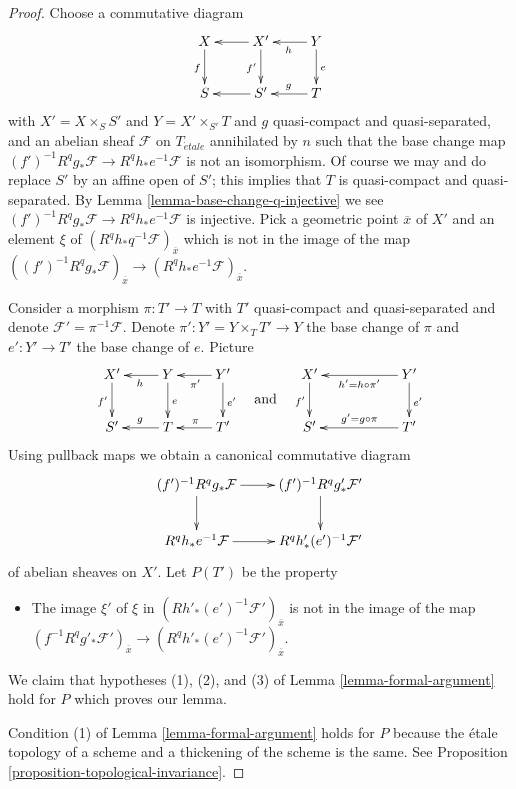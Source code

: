 \documentclass[10pt,a4paper]{amsart}
\theoremstyle{plain}
\theoremstyle{definition}
\theoremstyle{remark}
\numberwithin{equation}{subsection}
\def\etale{{\acute{e}tale}}
\begin{document}
\begin{proof}
Choose a commutative diagram
$$
\xymatrix{
X \ar[d]_f & X' \ar[l] \ar[d]_{f'} & Y \ar[l]^h \ar[d]^e \\
S & S' \ar[l] & T \ar[l]_g
}
$$
with $X' = X \times_S S'$ and $Y = X' \times_{S'} T$ and
$g$ quasi-compact and quasi-separated, and an abelian sheaf
$\mathcal{F}$ on $T_\etale$ annihilated by $n$ such that
the base change map
$(f')^{-1}R^qg_*\mathcal{F} \to R^qh_*e^{-1}\mathcal{F}$
is not an isomorphism. Of course we may and do replace $S'$
by an affine open of $S'$; this implies that $T$ is quasi-compact
and quasi-separated. By Lemma \ref{lemma-base-change-q-injective} we see
$(f')^{-1}R^qg_*\mathcal{F} \to R^qh_*e^{-1}\mathcal{F}$
is injective. Pick a geometric point $\overline{x}$ of $X'$
and an element $\xi$ of $(R^qh_*q^{-1}\mathcal{F})_{\overline{x}}$
which is not in the image of the map
$((f')^{-1}R^qg_*\mathcal{F})_{\overline{x}} \to
(R^qh_*e^{-1}\mathcal{F})_{\overline{x}}$.

\medskip\noindent
Consider a morphism $\pi : T' \to T$ with $T'$ quasi-compact
and quasi-separated and denote $\mathcal{F}' = \pi^{-1}\mathcal{F}$.
Denote $\pi' : Y' = Y \times_T T' \to Y$ the base change of $\pi$
and $e' : Y' \to T'$ the base change of $e$. Picture
$$
\vcenter{
\xymatrix{
X' \ar[d]_{f'} & Y \ar[l]^h \ar[d]^e & Y' \ar[l]^{\pi'} \ar[d]^{e'} \\
S' & T \ar[l]_g & T' \ar[l]_\pi
}
}
\quad\text{and}\quad
\vcenter{
\xymatrix{
X' \ar[d]_{f'} & & Y' \ar[ll]^{h' = h \circ \pi'} \ar[d]^{e'} \\
S' & & T' \ar[ll]_{g' = g \circ \pi}
}
}
$$
Using pullback maps we obtain a canonical commutative diagram
$$
\xymatrix{
(f')^{-1}R^qg_*\mathcal{F} \ar[r] \ar[d] &
(f')^{-1}R^qg'_*\mathcal{F}' \ar[d] \\
R^qh_*e^{-1}\mathcal{F} \ar[r] &
R^qh'_*(e')^{-1}\mathcal{F}'
}
$$
of abelian sheaves on $X'$. Let $P(T')$ be the property
\begin{itemize}
\item The image $\xi'$ of $\xi$ in
$(Rh'_*(e')^{-1}\mathcal{F}')_{\overline{x}}$ is
not in the image of the map
$(f^{-1}R^qg'_*\mathcal{F}')_{\overline{x}} \to
(R^qh'_*(e')^{-1}\mathcal{F}')_{\overline{x}}$.
\end{itemize}
We claim that hypotheses (1), (2), and (3) of
Lemma \ref{lemma-formal-argument} hold for $P$
which proves our lemma.

\medskip\noindent
Condition (1) of Lemma \ref{lemma-formal-argument}
holds for $P$ because the \'etale topology of a scheme
and a thickening of the scheme is the same. See
Proposition \ref{proposition-topological-invariance}.


\end{proof}
\end{document}
